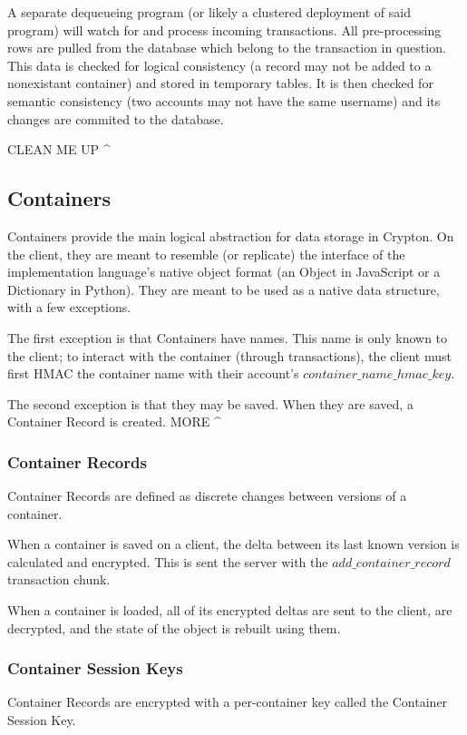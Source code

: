 \documentclass[conference]{IEEEtran}
\begin{document}
A separate dequeueing program (or likely a clustered deployment of said program) 
will watch for and process incoming transactions. All pre-processing rows are
pulled from the database which belong to the transaction in question. This
data is checked for logical consistency (a record may not be added to a
nonexistant container) and stored in temporary tables. It is then checked for
semantic consistency (two accounts may not have the same username) and its
changes are commited to the database.

CLEAN ME UP \^

\subsection{Containers}
Containers provide the main logical abstraction for data storage in Crypton.
On the client, they are meant to resemble (or replicate) the interface of
the implementation language's native object format (an Object in JavaScript or
a Dictionary in Python). They are meant to be used as a native data structure,
with a few exceptions.

The first exception is that Containers have names. This name is only known to
the client; to interact with the container (through transactions),
the client must first HMAC the container name with their account's
\(container\_name\_hmac\_key\).

The second exception is that they may be saved. When they are saved, a
Container Record is created. MORE \^

\subsubsection{Container Records}
Container Records are defined as discrete changes between versions of a
container.

When a container is saved on a client, the delta between its
last known version is calculated and encrypted. This is sent the server
with the \(add\_container\_record\) transaction chunk.

When a container is loaded, all of its encrypted deltas are sent to the
client, are decrypted, and the state of the object is rebuilt using them.

\subsubsection{Container Session Keys}
Container Records are encrypted with a per-container key called the Container
Session Key.
\end{document}
